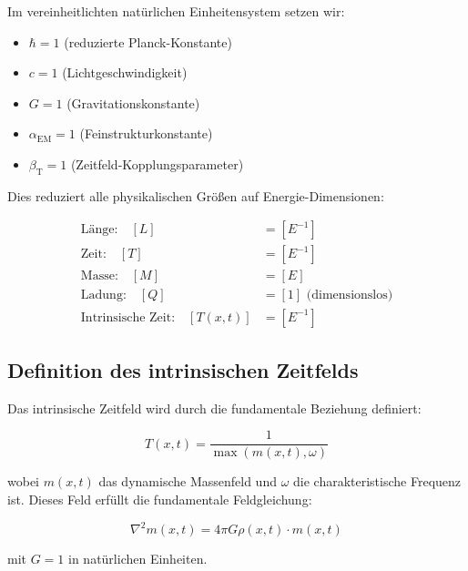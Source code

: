 \documentclass[12pt,a4paper]{article}
\newcommand{\Tfieldt}{T(x,t)}
\newcommand{\alphaEM}{\alpha_{\text{EM}}}
\newcommand{\betaT}{\beta_{\text{T}}}
\begin{document}
	Im vereinheitlichten natürlichen Einheitensystem setzen wir:
	\begin{itemize}
		\item $\hbar = 1$ (reduzierte Planck-Konstante)
		\item $c = 1$ (Lichtgeschwindigkeit)
		\item $G = 1$ (Gravitationskonstante)
		\item $\alphaEM = 1$ (Feinstrukturkonstante)
		\item $\betaT = 1$ (Zeitfeld-Kopplungsparameter)
	\end{itemize}
	
	Dies reduziert alle physikalischen Größen auf Energie-Dimensionen:
	
	\begin{tcolorbox}[colback=blue!5!white,colframe=blue!75!black,title=Dimensionsstruktur vereinheitlichter natürlicher Einheiten]
		\begin{align}
			\text{Länge:} \quad [L] &= [E^{-1}] \\
			\text{Zeit:} \quad [T] &= [E^{-1}] \\
			\text{Masse:} \quad [M] &= [E] \\
			\text{Ladung:} \quad [Q] &= [1] \text{ (dimensionslos)} \\
			\text{Intrinsische Zeit:} \quad [\Tfieldt] &= [E^{-1}]
		\end{align}
	\end{tcolorbox}
	
	\subsection{Definition des intrinsischen Zeitfelds}
	\label{subsec:time_field_definition}
	
	Das intrinsische Zeitfeld wird durch die fundamentale Beziehung definiert:
	
	\begin{equation}
		\Tfieldt = \frac{1}{\max(m(x,t), \omega)}
	\end{equation}
	
	wobei $m(x,t)$ das dynamische Massenfeld und $\omega$ die charakteristische Frequenz ist. Dieses Feld erfüllt die fundamentale Feldgleichung:
	
	\begin{equation}
		\nabla^2 m(x,t) = 4\pi G \rho(x,t) \cdot m(x,t)
	\end{equation}
	
	mit $G = 1$ in natürlichen Einheiten.
	
\end{document}
